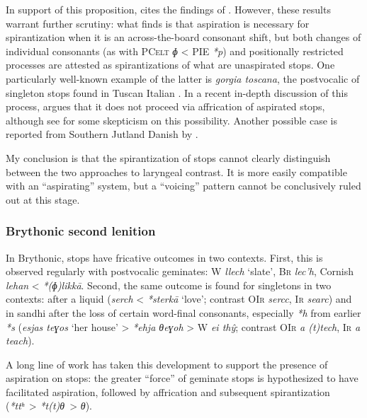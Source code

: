 \documentclass[output=paper,colorlinks,citecolor=brown]{langscibook}
\begin{document}
In support of this proposition, \textcite{Eska2018} cites the findings of \textcite[57]{kümmel2007konsonantenwandel}. However, these results warrant further scrutiny: what \textcite{kümmel2007konsonantenwandel} finds is that aspiration is necessary for  spirantization when it is an across\hyp the\hyp board consonant shift, but both changes of individual consonants (as with \textsc{PCelt} \textit{ɸ} < PIE \textit{*p}) and positionally restricted  processes are attested as spirantizations of what are unaspirated  stops. One particularly well\hyp known example of the latter is \textit{gorgia toscana}, the postvocalic  of singleton  stops found in Tuscan Italian . In a recent in\hyp depth discussion of this process, \textcite{marotta2008lenition} argues that it does not proceed via affrication of aspirated stops, although see \textcite{honeybone2023can} for some skepticism on this possibility. Another possible case is reported from Southern Jutland Danish by \textcite{pi:puggaard-rode2024variation}.

My conclusion is that the spirantization of  stops cannot clearly distinguish between the two approaches to laryngeal contrast. It is more easily compatible with an \enquote{aspirating} system, but a \enquote{voicing} pattern cannot be conclusively ruled out at this stage.

\subsubsection{Brythonic second lenition}
\label{sec:bryth-second-lenit}

In Brythonic,  stops have fricative outcomes in two contexts. First, this is observed regularly with postvocalic  geminates: W \textit{llech} `slate', \textsc{Br} \textit{lec'h}, Cornish \textit{lehan} < \textit{*(ɸ)likkā}. Second, the same outcome is found for  singletons in two contexts: after a liquid (\textit{serch} < \textit{*sterkā} `love'; contrast \textsc{OIr} \textit{sercc}, \textsc{Ir} \textit{searc}) and in sandhi after the loss of certain word\hyp final consonants, especially \textit{*h} from earlier \textit{*s} (\textit{esjas teɣos} `her house' > \textit{*ehja θeɣoh} > W \textit{ei thŷ}; contrast \textsc{OIr} \textit{a (t)tech}, \textsc{Ir} \textit{a teach}).

A long line of work \parencite{lheb, jackson60, koch89, koch90, isaac, isaac08:_bryth} has taken this development to support the presence of aspiration on  stops: the greater \enquote{force} of geminate stops is hypothesized to have facilitated aspiration, followed by affrication and subsequent spirantization (\textit{*ttʰ}~> \textit{*t(t)θ}~> \textit{θ}).
\end{document}
